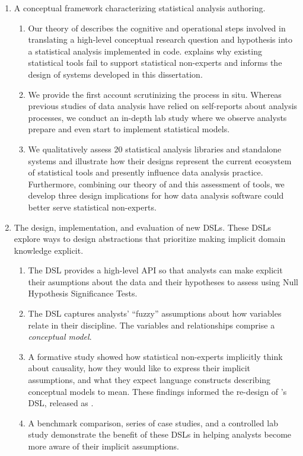 \begin{enumerate} 
    \item A conceptual framework characterizing statistical analysis authoring.
    \begin{enumerate}
        \item Our theory of \hypoForm describes the cognitive and operational
        steps involved in translating a high-level conceptual research question
        and hypothesis into a statistical analysis implemented in code.
        \HypoForm explains why existing statistical
        tools fail to support statistical non-experts and informs the design
        of systems developed in this dissertation.
        \item We provide the first account scrutinizing the \hypoForm process in
        situ. Whereas previous studies of data analysis have relied on
        self-reports about analysis processes, we conduct an in-depth lab study where we
        observe analysts prepare and even start to implement statistical
        models. 
        \item We qualitatively assess 20 statistical analysis libraries and
        standalone systems and illustrate how their designs represent the
        current ecosystem of statistical tools and presently influence data
        analysis practice. Furthermore, combining our theory of \hypoForm and
        this assessment of tools, we develop three design implications for how
        data analysis software could better serve statistical non-experts. 
    \end{enumerate}

    \item The design, implementation, and evaluation of new DSLs. These DSLs
    explore ways to design abstractions that prioritize making implicit domain
    knowledge explicit. 
    \begin{enumerate}
        \item The \tea DSL provides a high-level API so that analysts can make
        explicit their asumptions about the data and their hypotheses to assess
        using Null Hypothesis Significance Tests. 
        \item The \tisane DSL captures analysts' ``fuzzy'' assumptions about how
        variables relate in their discipline. The variables and relationships
        comprise a \textit{conceptual model}.
        \item A formative study showed how statistical non-experts implicitly
        think about causality, how they would like to express their implicit
        assumptions, and what they expect language constructs describing
        conceptual models to mean. These findings informed the re-design of
        \tisane's DSL, released as \rTisane.
        \item A benchmark comparison, series of case studies, and a controlled lab study demonstrate the benefit of
        these DSLs in helping analysts become more aware of their implicit
        assumptions. 
    \end{enumerate}


\end{enumerate}
